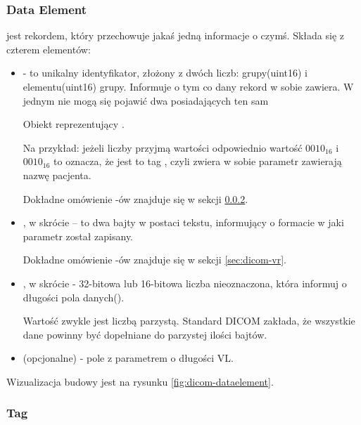 \subsubsection{Data Element}

 jest rekordem, który przechowuje jakaś jedną informacje o czymś.
Składa się z czterem elementów:

\begin{itemize}

    \item {} - to unikalny identyfikator, złożony z dwóch liczb: grupy(uint16) i elementu(uint16) grupy.
    Informuje o tym co dany rekord w sobie zawiera.
    W jednym  nie mogą się pojawić dwa  posiadających ten sam 
    
    Obiekt reprezentujący .

    Na przykład: jeżeli liczby  przyjmą wartości odpowiednio wartość $0010_{16}$ i $0010_{16}$ to oznacza, że jest to tag , czyli zwiera w sobie parametr zawierają nazwę pacjenta.

    Dokładne omówienie -ów znajduje się w sekcji \ref{sec:dicom-tag}.

    \item {}, w skrócie  – to dwa bajty w postaci tekstu, informujący o formacie w jaki parametr został zapisany.
    
    Dokładne omówienie -ów znajduje się w sekcji \ref{sec:dicom-vr}.

    \item {}, w skrócie  - 32-bitowa lub 16-bitowa liczba nieoznaczona, która informuj o długości pola danych().
    
    Wartość  zwykle jest liczbą parzystą.
    Standard DICOM zakłada, że wszystkie dane powinny być dopełniane do parzystej ilości bajtów.
    
    \item {} (opcjonalne) - pole z parametrem o długości VL.
    
\end{itemize}

Wizualizacja budowy  jest na rysunku \ref{fig:dicom-dataelement}.

\subsubsection{Tag}
\label{sec:dicom-tag}

